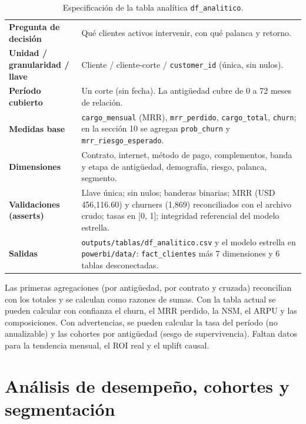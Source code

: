 \documentclass[10.5pt,a4paper]{article}
\begin{document}
\begin{table}[H]
\centering\footnotesize
\caption{Especificación de la tabla analítica \texttt{df\_analitico}.}
\begin{tabularx}{\textwidth}{@{}>{\bfseries}P{3.2cm}X@{}}
\toprule
Pregunta de decisión & Qué clientes activos intervenir, con qué palanca y retorno. \\
Unidad / granularidad / llave & Cliente / cliente-corte / \texttt{customer\_id} (única, sin nulos). \\
Período cubierto & Un corte (sin fecha). La antigüedad cubre de 0 a 72 meses de relación. \\
Medidas base & \texttt{cargo\_mensual} (MRR), \texttt{mrr\_perdido}, \texttt{cargo\_total}, \texttt{churn}; en la sección 10 se agregan \texttt{prob\_churn} y \texttt{mrr\_riesgo\_esperado}. \\
Dimensiones & Contrato, internet, método de pago, complementos, banda y etapa de antigüedad, demografía, riesgo, palanca, segmento. \\
Validaciones (asserts) & Llave única; sin nulos; banderas binarias; MRR (USD 456,116.60) y churners (1,869) reconciliados con el archivo crudo; tasas en [0, 1]; integridad referencial del modelo estrella. \\
Salidas & \texttt{outputs/tablas/df\_analitico.csv} y el modelo estrella en \texttt{powerbi/data/}: \texttt{fact\_clientes} más 7 dimensiones y 6 tablas desconectadas. \\
\bottomrule
\end{tabularx}
\end{table}

Las primeras agregaciones (por antigüedad, por contrato y cruzada) reconcilian con los totales y se calculan como razones de sumas. Con la tabla actual se pueden calcular con confianza el churn, el MRR perdido, la NSM, el ARPU y las composiciones. Con advertencias, se pueden calcular la tasa del período (no anualizable) y las cohortes por antigüedad (sesgo de supervivencia). Faltan datos para la tendencia mensual, el ROI real y el uplift causal.

\section{Análisis de desempeño, cohortes y segmentación}
\end{document}

